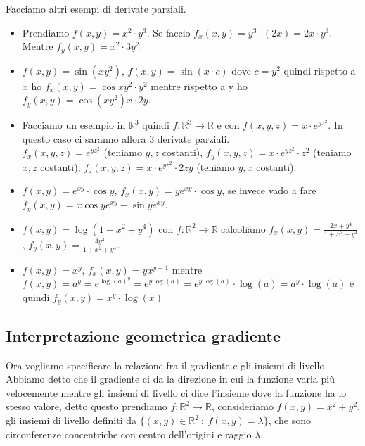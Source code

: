 \begin{example}
Facciamo altri esempi di derivate parziali.
\begin{itemize}
    \item Prendiamo $f(x,y) = x^2 \cdot y^3$. Se faccio $f_x(x,y) = y^3 \cdot (2x) = 2x\cdot y^3$. Mentre $f_y(x,y) = x^2 \cdot 3y^2$.
    \item $f(x,y) = \sin(xy^2)$, $f (x,y) = \sin(x \cdot c)$ dove $c = y^2$ quindi rispetto a $x$ ho $f_x(x,y) = \cos{xy^2} \cdot y^2$ mentre rispetto a y ho $f_y (x,y) = \cos(xy^2)x \cdot 2y$.
    \item Facciamo un esempio in $\mathbb{R}^3$ quindi $f: \mathbb{R}^3 \to \mathbb{R}$ e con $f(x,y,z) = x \cdot e^{yz^2}$. In questo caso ci saranno allora 3 derivate parziali.\\
    $f_x(x,y,z) = e^{yz^2}$ (teniamo $y,z$ costanti), $f_y(x,y,z) = x \cdot e^{yz^2} \cdot z^2$ (teniamo $x,z$ costanti), $f_z(x,y,z) = x \cdot e^{yz^2} \cdot 2zy$ (teniamo $y,x$ costanti).
    \item $f(x,y) = e^{xy} \cdot \cos{y}$, $f_x(x,y) = ye^{xy}\cdot \cos{y}$, se invece vado a fare $f_y (x,y) = x\cos{y}e^{xy} - \sin{y} e^{xy}$.
    \item $f(x,y) = \log(1 + x^2 + y^4)$ con $f:\mathbb{R}^2 \to \mathbb{R}$ calcoliamo $f_x(x,y) = \frac{2x + y^4}{1 + x^2 + y^4}$, $f_y(x,y) = \frac{4y^3}{1 + x^2 +y^4}$.
    \item $f(x,y) = x^y$, $f_x(x,y) = yx^{y-1}$ mentre $f(x,y) = a^y = e^{\log(a)^y} = e^{y\log(a)} = e^{y \log(a)} \cdot \log(a) = a^y \cdot \log(a)$ e quindi $f_y(x,y) = x^y \cdot \log(x)$
\end{itemize}
\end{example}

\subsection{Interpretazione geometrica gradiente}
Ora vogliamo specificare la relazione fra il gradiente e gli insiemi di livello. Abbiamo detto che il gradiente ci da la direzione in cui la funzione varia più velocemente mentre gli insiemi di livello ci dice l'insieme dove la funzione ha lo stesso valore, detto questo prendiamo $f:\mathbb{R}^2 \to \mathbb{R}$, consideriamo $f(x,y) = x^2 + y^2$, gli insiemi di livello definiti da $\{(x,y) \in \mathbb{R}^2 \::\: f(x,y) = \lambda\}$, che sono circonferenze concentriche con centro dell'origini e raggio $\lambda$.\\

